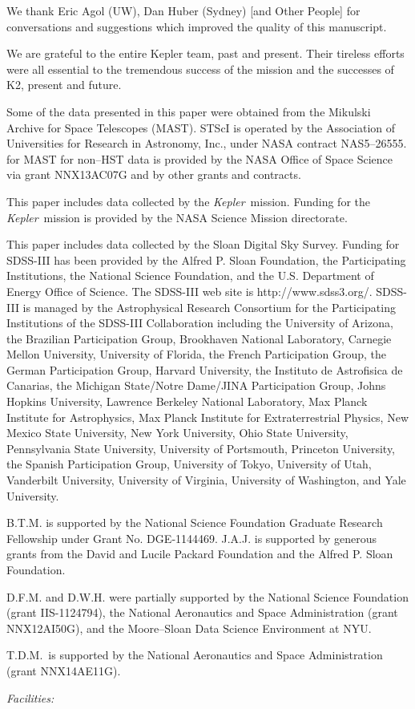 \documentclass{emulateapj}
\newcommand{\project}[1]{\textsl{#1}}
\newcommand{\kep}{\project{Kepler}}
\newcommand{\todo}[3]{{\color{#2} \emph{#1} TO DO: #3}}
\newcommand{\btmtodo}[1]{\todo{BEN}{red}{#1}}
\begin{document}
\acknowledgements
We thank Eric Agol (UW), Dan Huber (Sydney) [and Other People] for conversations and
suggestions which improved the quality of this manuscript.


We are grateful to the entire Kepler team, past and present. 
Their tireless efforts were all essential to the tremendous success of the mission and the
successes of K2, present and future.


Some of the data presented in this paper were obtained from the Mikulski
Archive for Space Telescopes (MAST). 
STScI is operated by the Association of Universities for Research 
in Astronomy, Inc., under NASA contract NAS5--26555. 
for MAST for non--HST data is provided by the NASA Office of Space 
Science via grant NNX13AC07G and by other grants and contracts. 

This paper includes data collected by the \kep\ mission. 
Funding for the \kep\ mission is provided by the NASA Science 
Mission directorate.

This paper includes data collected by the Sloan Digital Sky Survey.
Funding for SDSS-III has been provided by the Alfred P. Sloan Foundation,
the Participating Institutions, the National Science Foundation, and the
U.S. Department of Energy Office of Science. The SDSS-III web site is
http://www.sdss3.org/.
SDSS-III is managed by the Astrophysical Research Consortium for the
Participating Institutions of the SDSS-III Collaboration including the
University of Arizona, the Brazilian Participation Group, Brookhaven
National Laboratory, Carnegie Mellon University, University of Florida,
the French Participation Group, the German Participation Group, Harvard
University, the Instituto de Astrofisica de Canarias, the Michigan
State/Notre Dame/JINA Participation Group, Johns Hopkins University,
Lawrence Berkeley National Laboratory, Max Planck Institute for
Astrophysics, Max Planck Institute for Extraterrestrial Physics, New
Mexico State University, New York University, Ohio State University,
Pennsylvania State University, University of Portsmouth, Princeton
University, the Spanish Participation Group, University of Tokyo,
University of Utah, Vanderbilt University, University of Virginia,
University of Washington, and Yale University.

B.T.M. is supported by the National Science Foundation Graduate Research
Fellowship under Grant No. DGE‐1144469. 
J.A.J. is supported by generous grants from the David and Lucile Packard
Foundation and the Alfred P. Sloan Foundation.


D.F.M. and D.W.H. were partially supported by the National Science Foundation 
(grant IIS-1124794), the National Aeronautics and Space Administration (grant 
NNX12AI50G), and the Moore–Sloan Data Science Environment at NYU.

T.D.M.~is supported by the National Aeronautics and Space Administration (grant 
NNX14AE11G).

{\it Facilities:} %









\end{document}
